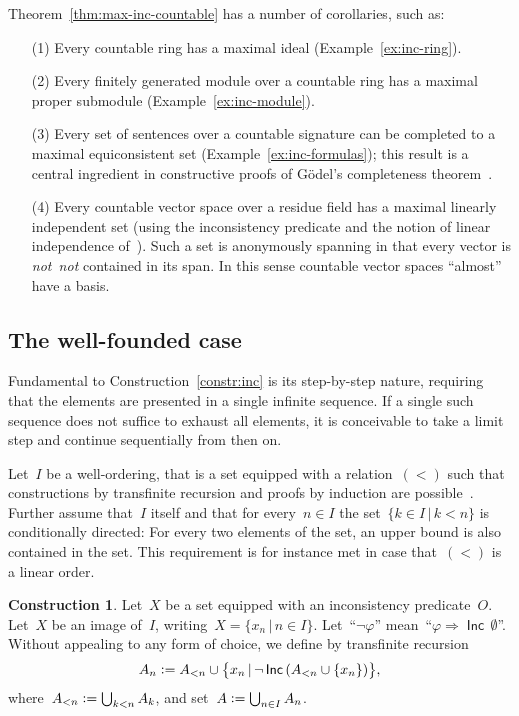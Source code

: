 \documentclass[com,11pt,crcready]{iosart2x}
\theoremstyle{definition}
\newtheorem{construction}{Construction}[section]
\theoremstyle{plain}
\theoremstyle{remark}
\newcommand{\Incbare}{\mathsf{Inc}}
\newcommand{\Inc}[1]{\operatorname{\Incbare}\,#1}
\newcommand{\?}{\,{:}\,}
\newcommand{\defeq}{\vcentcolon=}
\renewcommand{\_}{\mathpunct{.}\,}
\begin{document}
Theorem~\ref{thm:max-inc-countable} has a number of corollaries, such as:
\begin{enumerate}
\item[(1)] Every countable ring has a maximal ideal (Example~\ref{ex:inc-ring}).
\item[(2)] Every finitely generated module
over a countable ring has a maximal proper submodule
(Example~\ref{ex:inc-module}).
\item[(3)] Every set of sentences over a countable signature can be completed to a
maximal equiconsistent set (Example~\ref{ex:inc-formulas});
this result is a central ingredient in constructive proofs of
Gödel's completeness theorem~\cite{krivine:completeness,herbelin-ilik:henkin,forster-kirst-wehr:completeness}.
\item[(4)] Every countable vector space over a residue field has a maximal linearly
independent set (using the inconsistency predicate and the notion of linear
independence of~\cite[Section~6]{wessel-schuster:radical}). Such a set is
anonymously spanning in that every vector is \emph{not~not} contained in its
span. In this sense countable vector spaces ``almost'' have a basis.
\end{enumerate}


\subsection{The well-founded case}

Fundamental to Construction~\ref{constr:inc} is its step-by-step nature,
requiring that the elements are presented in a single infinite sequence.
If a single such sequence does not
suffice to exhaust all elements, it is conceivable to take a limit step and continue
sequentially from then on.

Let~$I$ be a well-ordering, that is a set equipped with a relation~$({<})$ such
that constructions by transfinite recursion and proofs by induction are
possible~\cite{XXX}. Further assume that~$I$ itself and that for every~$n \in
I$ the set~$\{ k \in I \,|\, k < n \}$ is conditionally directed: For every two
elements of the set, an upper bound is also contained in the set. This
requirement is for instance met in case that~$({<})$ is a linear order.

\begin{construction}\label{constr:inc-wf}Let~$X$ be a set equipped with
an inconsistency predicate~$O$. Let~$X$ be an image of~$I$, writing~$X = \{ x_n
\,|\, n \in I \}$. Let~``$\neg\varphi$'' mean~``$\varphi \Rightarrow
\Inc{\emptyset}$''. Without appealing to any form of choice, we define by
transfinite recursion
\[ A_n \defeq A_{<n} \cup \bigl\{ x_n \,|\, \neg \Inc{(A_{<n}\cup\{x_n\})} \bigr\}, \]
where~$A_{<n} \defeq \bigcup_{k < n} A_k$, and set~$A \defeq \bigcup_{n \in I} A_n$.
\end{construction}
\end{document}
